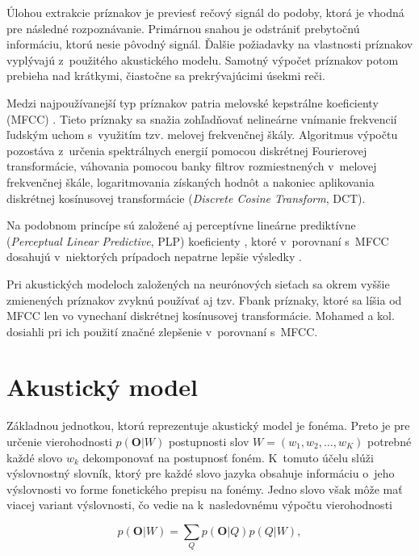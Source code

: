 Úlohou extrakcie príznakov je previesť rečový signál do podoby, ktorá je vhodná pre následné rozpoznávanie. Primárnou snahou je odstrániť prebytočnú informáciu, ktorú nesie pôvodný signál. Ďalšie požiadavky na vlastnosti príznakov vyplývajú z~použitého akustického modelu. 
Samotný výpočet príznakov potom prebieha nad krátkymi, čiastočne sa prekrývajúcimi úsekmi reči. 

Medzi najpoužívanejší typ príznakov patria melovské kepstrálne koeficienty (MFCC) \cite{Davis1980}. Tieto
príznaky sa snažia zohľadňovať nelineárne vnímanie frekvencií ľudským uchom 
s~využitím tzv. melovej frekvenčnej škály. Algoritmus výpočtu pozostáva z~určenia spektrálnych energií pomocou diskrétnej Fourierovej transformácie, váhovania pomocou banky filtrov rozmiestnených v~melovej frekvenčnej škále, logaritmovania získaných hodnôt a nakoniec aplikovania diskrétnej kosínusovej transformácie (\textit{Discrete Cosine Transform}, DCT).

Na podobnom princípe sú založené aj perceptívne lineárne prediktívne (\textit{Perceptual Linear Predictive}, PLP) koeficienty \cite{Hermansky1990}, ktoré v~porovnaní s~MFCC dosahujú v~niektorých prípadoch nepatrne lepšie výsledky \cite{Woodland1997}.

Pri akustických modeloch založených na neurónových sieťach sa okrem vyššie zmienených príznakov zvyknú používať aj tzv. Fbank príznaky, ktoré sa líšia
od MFCC len vo vynechaní diskrétnej kosínusovej transformácie.
Mohamed a kol. \cite{Mohamed2012} dosiahli pri ich použití značné zlepšenie v~porovnaní s~MFCC.


\section{Akustický model}

Základnou jednotkou, ktorú reprezentuje akustický model je fonéma. Preto je pre
určenie vierohodnosti $p(\bm{O}| W)$ postupnosti slov $W = (w_1, w_2, \dots, w_K)$ potrebné každé slovo $w_k$ dekomponovať na postupnosť foném. K~tomuto účelu slúži výslovnostný slovník, ktorý pre každé slovo jazyka obsahuje informáciu o~jeho výslovnosti vo forme fonetického prepisu na fonémy. Jedno slovo však môže mať viacej variant výslovnosti, čo vedie na k~nasledovnému výpočtu vierohodnosti

\begin{equation} \label{eq:word-prob-computation}
    p(\bm{O}| W) = \sum_Q p(\bm{O}|Q) p(Q|W),
\end{equation}

